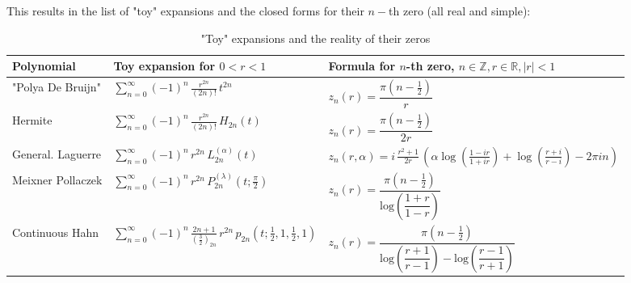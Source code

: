 \documentclass[a4paper,11pt,twoside]{amsart}
\newcommand{\verifiedeq}{=}
\newcommand{\verifiedeq}{\stackrel{\checkmark}{=}}
\begin{document}
\begin{itemize}
This results in the list of "toy" expansions and the closed forms for their $n-$th zero (all real and simple):
\begin{table}[H]
  \begin{center}
    \caption{"Toy" expansions and the reality of their zeros}
    \label{tab:tablezeros}
    \begin{tabular}{l|l|l|} 
      Polynomial & Toy expansion for $0 < r < 1$ & Formula for  $n$-th zero, $ n \in \mathbb{Z}, r \in \mathbb{R}, |r| < 1$\\
      \hline
      "Polya De Bruijn" & $\displaystyle \sum_{n=0}^\infty (-1)^n\, \frac{ r^{2n}}{(2n)!}\,t^{2n}$  &$\displaystyle z_n(r) \verifiedeq \dfrac{\pi  \left(n-\frac12\right)}{r}$ \\       
      Hermite & $\displaystyle \sum_{n=0}^\infty (-1)^n\, \frac{ r^{2n}}{(2n)!}\, H_{2n}\left(t\right)$  &$\displaystyle z_n(r) \verifiedeq \dfrac{\pi  \left(n-\frac12\right)}{2r}$ \\
      General. Laguerre & $\displaystyle \sum_{n=0}^\infty (-1)^n\,r^{2n} \,L_{2n}^{\left(\alpha\right)}(t)$ & $\displaystyle z_n(r,\alpha) \verifiedeq i\,\frac{r^2+1}{2r}\,\left(\alpha\log\left(\frac{1-ir}{1+ir}\right)+\log\left(\frac{r+i}{r-i}\right)-2\pi i n\right)$ \\ 
      Meixner Pollaczek & $\displaystyle \sum_{n=0}^\infty (-1)^n\, r^{2n}\, P_{2n}^{\left(\lambda\right)}\left(t; \frac{\pi}{2}\right)$ &  $\displaystyle z_n(r) \verifiedeq \dfrac{\pi  \left(n-\frac12\right)}{\mathrm{log}\! \left(\dfrac{1+r}{1-r}\right)}$ \\
      Continuous Hahn & $\displaystyle \sum_{n=0}^\infty (-1)^n\, \frac{2n+1}{\left(\frac32\right)_{2n}}\,r^{2n}\,p_{2n}\left(t;\frac12,1,\frac12,1\right)$  & $\displaystyle z_n(r) \verifiedeq \dfrac{\pi  \left(n-\frac12\right)}{\mathrm{log}\! \left(\dfrac{r +1}{r-1}\right)-\mathrm{log}\! \left(\dfrac{r-1}{r+1}\right)}$\\
    \end{tabular}
  \end{center}
\end{table}

\end{itemize}
\end{document}
